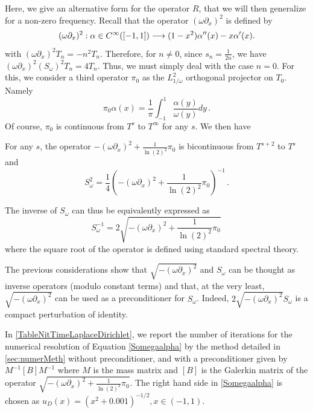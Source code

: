\documentclass[a4paper]{article}
\begin{document}
Here, we give an alternative form for the operator $R$, that we will then generalize for a non-zero frequency. 
\noindent Recall that the operator $(\omega\partial_x)^2$ is defined by \[(\omega\partial_x)^2 : \alpha \in C^{\infty}([-1,1]) \longrightarrow (1-x^2)\alpha''(x) - x \alpha'(x).\]
with $(\omega \partial_x)^2T_n = -n^2 T_n$. Therefore, for $n \neq 0$, since $s_n = \frac{1}{2n}$, we have $(\omega \partial_x)^2 (S_\omega)^2 T_n = 4 T_n$. Thus, we must simply deal with the case $n=0$. For this, we consider a third operator $\pi_{0}$ as the $L^2_{1/\omega}$ orthogonal projector on $T_0$. Namely 
\[\pi_0 \alpha(x)  = \frac{1}{\pi} \int_{-1}^{1}\frac{\alpha(y)}{\omega(y)}dy\,.\] 
Of course, $\pi_0$ is continuous from $T^s$ to $T^{\infty}$ for any $s$. We then have
\begin{The}
	\label{TheSdx2S}
	For any $s$, the operator $-(\omega\partial_x)^2 + \frac{1}{\ln(2)^2} \pi_0 $ is bicontinuous from $T^{s+2}$ to $T^s$ and
	\begin{equation*}
		S_{\omega}^2 = \frac{1}{4}\left(-(\omega\partial_x)^2 + \frac{1}{\ln(2)^2} \pi_0 \right)^{-1}\,.
	\end{equation*}
\end{The}
\noindent The inverse of $S_\omega$ can thus be equivalently expressed as 
\[S_{\omega}^{-1} = 2\sqrt{-(\omega \partial_x)^2 + \frac{1}{\ln(2)^2}\pi_0}\,\]
where the square root of the operator is defined using standard spectral theory. 

The previous considerations show that $\sqrt{-(\omega \partial_x)^2}$ and $S_\omega$ can be thought as inverse operators (modulo constant terms) and that, at the very least, $\sqrt{-(\omega \partial_x)^2}$ can be used as a preconditioner for $S_\omega$. Indeed, $2\sqrt{-(\omega \partial_x)^2}S_\omega$ is a compact perturbation of identity. 

In \autoref{TableNitTimeLaplaceDirichlet}, we report the number of iterations for the numerical resolution of Equation \eqref{Somegaalpha} by the method detailed in \autoref{sec:numerMeth} without preconditioner, and with a preconditioner given by $M^{-1} \left[B \right] M^{-1}$ where $M$ is the mass matrix and $\left[ B \right]$ is the Galerkin matrix of the operator $\sqrt{ -(\omega \partial_x)^2 + \frac{1}{\ln(2)^2} \pi_0}$. The right hand side in \eqref{Somegaalpha} is chosen as $u_D(x) = (x^2 + 0.001)^{-1/2}, x \in (-1,1)$.
\end{document}
